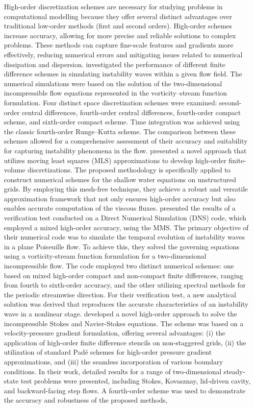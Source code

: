 \documentclass[preprint, 12pt]{elsarticle}
\begin{document}
High-order discretization schemes are necessary for studying problems in computational modelling because they offer several distinct advantages over traditional low-order methods (first and second orders). High-order schemes increase accuracy, allowing for more precise and reliable solutions to complex problems. These methods can capture fine-scale features and gradients more effectively, reducing numerical errors and mitigating issues related to numerical dissipation and dispersion. \citet{Souza2005} investigated the performance of different finite difference schemes in simulating instability waves within a given flow field. The numerical simulations were based on the solution of the two-dimensional incompressible flow equations represented in the vorticity–stream function formulation. Four distinct space discretization schemes were examined: second-order central differences, fourth-order central differences, fourth-order compact scheme, and sixth-order compact scheme. Time integration was achieved using the classic fourth-order Runge–Kutta scheme. The comparison between these schemes allowed for a comprehensive assessment of their accuracy and suitability for capturing instability phenomena in the flow. \citet{Cueto2006} presented a novel approach that utilizes moving least squares (MLS) approximations to develop high-order finite-volume discretizations. The proposed methodology is specifically applied to construct numerical schemes for the shallow water equations on unstructured grids. By employing this mesh-free technique, they achieve a robust and versatile approximation framework that not only ensures high-order accuracy but also enables accurate computation of the viscous fluxes. \citet{Silva2010} presented the results of a verification test conducted on a Direct Numerical Simulation (DNS) code, which employed a mixed high-order accuracy, using the MMS. The primary objective of their numerical code was to simulate the temporal evolution of instability waves in a plane Poiseuille flow. To achieve this, they solved the governing equations using a vorticity-stream function formulation for a two-dimensional incompressible flow. The code employed two distinct numerical schemes: one based on mixed high-order compact and non-compact finite differences, ranging from fourth to sixth-order accuracy, and the other utilizing spectral methods for the periodic streamwise direction. For their verification test, a new analytical solution was derived that reproduces the accurate characteristics of an instability wave in a nonlinear stage. \citet{Fadel2011} developed a novel high-order approach to solve the incompressible Stokes and Navier-Stokes equations. The scheme was based on a velocity-pressure gradient formulation, offering several advantages: (i) the application of high-order finite difference stencils on non-staggered grids, (ii) the utilization of standard Padé schemes for high-order pressure gradient approximations, and (iii) the seamless incorporation of various boundary conditions. In their work, detailed results for a range of two-dimensional steady-state test problems were presented, including Stokes, Kovasznay, lid-driven cavity, and backward-facing step flows. A fourth-order scheme was used to demonstrate the accuracy and robustness of the proposed methods, 
\end{document}
